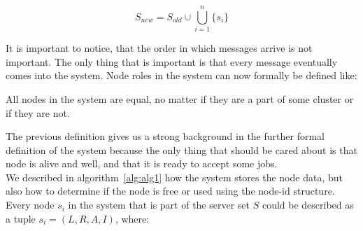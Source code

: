 \begin{equation}
	S_{\mathit{new}} = S_{\mathit{old}} \cup \bigcup%
	_{i=1}^{n} \{s_i\}
\end{equation}
 
\noindent 
It is important to notice, that the order in which messages arrive is not important. The only thing that is important is that every message eventually comes into the system. Node roles in the system can now formally be defined like:

\begin{definition}
	All nodes in the system are equal, no matter if they are a part of some cluster or if they are not.
\end{definition}

\noindent
The previous definition gives us a strong background in the further formal definition of the system because the only thing that should be cared about is that node is alive and well, and that it is ready to accept some jobs.\\

We described in algorithm~\ref{alg:alg1} how the system stores the node data, but also how to determine if the node is free or used using the node-id structure. Every node $s_i$ in the system that is part of the server set $S$ could be described as a tuple $s_i = (L, R, A, I)$, where:

